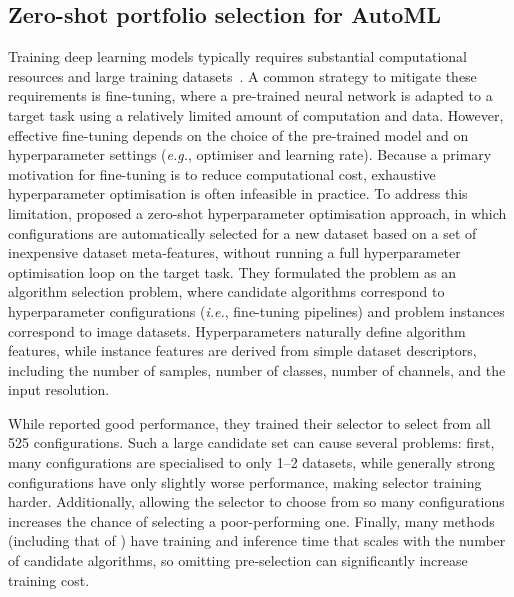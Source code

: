 \subsection{Zero-shot portfolio selection for AutoML}
\label{sec:zap}

Training deep learning models typically requires substantial computational resources and large training datasets~\citep{SchEtAl20}. A common strategy to mitigate these requirements is fine-tuning, where a pre-trained neural network is adapted to a target task using a relatively limited amount of computation and data.
However, effective fine-tuning depends on the choice of the pre-trained model and on hyperparameter settings (\emph{e.g.}, optimiser and learning rate). 
Because a primary motivation for fine-tuning is to reduce computational cost, exhaustive hyperparameter optimisation is often infeasible in practice.
To address this limitation, \citet{OztEtAl22} proposed a zero-shot hyperparameter optimisation approach, in which configurations are automatically selected for a new dataset based on a set of inexpensive dataset meta-features, without running a full hyperparameter optimisation loop on the target task. 
They formulated the problem as an algorithm selection problem, where candidate algorithms correspond to hyperparameter configurations (\emph{i.e.}, fine-tuning pipelines) and problem instances correspond to image datasets. Hyperparameters naturally define algorithm features, while instance features are derived from simple dataset descriptors, including the number of samples, number of classes, number of channels, and the input resolution.

While \citet{OztEtAl22} reported good performance, they trained their selector to select from all 525 configurations. Such a large candidate set can cause several problems: first, many configurations are specialised to only 1--2 datasets, while generally strong configurations have only slightly worse performance, making selector training harder.
Additionally, allowing the selector to choose from so many configurations increases the chance of selecting a poor-performing one.
Finally, many methods (including that of \citet{OztEtAl22}) have training and inference time that scales with the number of candidate algorithms, so omitting pre-selection can significantly increase training cost.

